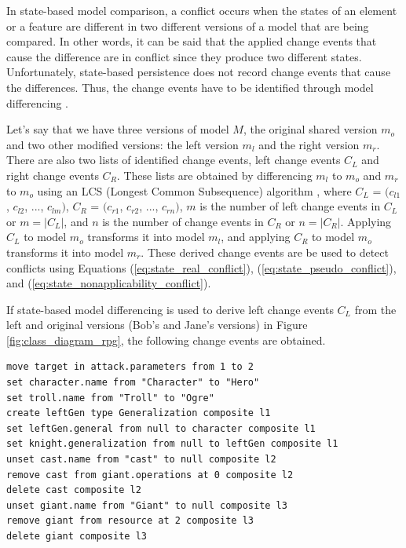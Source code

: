 In state-based model comparison, a conflict occurs when the states of an element or a feature are different in two different versions of a model that are being compared. In other words, it can be said that the applied change events that cause the difference are in conflict since they produce two different states. Unfortunately, state-based persistence does not record change events that cause the differences. Thus, the change events have to be identified through model differencing \cite{emfcompare2018developer,yohannis2019efficient}. 

Let’s say that we have three versions of model $M$, the original shared version $m_{o}$ and two other modified versions: the left version $m_{l}$ and the right version $m_{r}$. There are also two lists of identified change events, left change events $C_{L}$ and right change events $C_{R}$. These lists are obtained by differencing $m_{l}$ to $m_{o}$ and $m_{r}$ to $m_{o}$ using an LCS (Longest Common Subsequence) algorithm \cite{emfcompare2018developer,DBLP:journals/algorithmica/Meyers86}, where $C_{L}$ = $(c_{l1}$, $c_{l2}$, ..., $c_{lm})$, $C_{R}$ = $(c_{r1}$, $c_{r2}$, ..., $c_{rn})$, $m$ is the number of left change events in $C_{L}$ or $m = |C_{L}|$, and $n$ is the number of change events in $C_{R}$ or $n = |C_{R}|$. Applying $C_{L}$ to model $m_{o}$ transforms it into model $m_{l}$, and applying $C_{R}$ to model $m_{o}$ transforms it into model $m_{r}$. These derived change events are be used to detect conflicts using Equations (\ref{eq:state_real_conflict}), (\ref{eq:state_pseudo_conflict}), and (\ref{eq:state_nonapplicability_conflict}).  

If state-based model differencing is used to derive left change events $C_{L}$ from the left and original versions (Bob's and Jane's versions) in Figure \ref{fig:class_diagram_rpg}, the following change events are obtained. 
\begin{lstlisting}[firstnumber=1,style=eol,caption={The derived, minimal change events to produce the left version (Bob's version) in Figure \ref{fig:class_diagram_left} from the original version (Jane's version).},label=lst:cbp_left_state]
move target in attack.parameters from 1 to 2
set character.name from "Character" to "Hero"
set troll.name from "Troll" to "Ogre"
create leftGen type Generalization composite l1
set leftGen.general from null to character composite l1
set knight.generalization from null to leftGen composite l1
unset cast.name from "cast" to null composite l2
remove cast from giant.operations at 0 composite l2
delete cast composite l2
unset giant.name from "Giant" to null composite l3
remove giant from resource at 2 composite l3
delete giant composite l3
\end{lstlisting}

